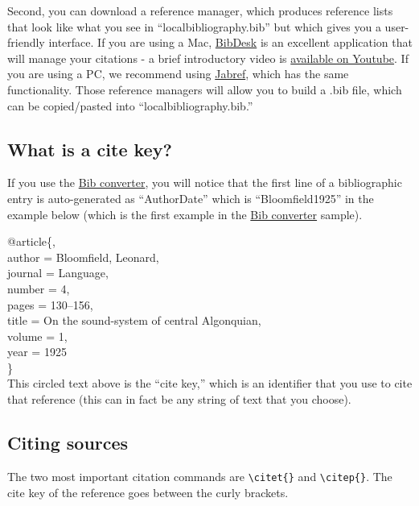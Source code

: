 \documentclass[output=paper,colorlinks,citecolor=brown,
]{langscibook}
\begin{document}
Second, you can download a reference manager, which produces reference lists that look like what you see in ``localbibliography.bib'' but which gives you a user-friendly interface. If you are using a Mac, \href{https://bibdesk.sourceforge.io}{BibDesk} is an excellent application that will manage your citations - a brief introductory video is \href{https://www.youtube.com/watch?v=sOxf1bKAxqQ}{available on Youtube}. If you are using a PC, we recommend using \href{http://www.jabref.org}{Jabref}, which has the same functionality. Those reference managers will allow you to build a .bib file, which can be copied/pasted into ``localbibliography.bib.'' 

\subsection{What is a cite key?}

If you use the \href{http://glottotopia.org/doc2tex/doc2bib}{Bib converter}, you will notice that the first line of a bibliographic entry is auto-generated as ``AuthorDate'' which is ``Bloomfield1925'' in the example below (which is the first example in the \href{http://glottotopia.org/doc2tex/doc2bib}{Bib converter} sample). 

\indent @article\{, \\
\indent \indent author = {Bloomfield, Leonard}, \\
\indent\indent journal = {Language}, \\
\indent\indent number = {4},\\
\indent\indent pages = {130--156},\\
\indent\indent title = {On the sound-system of central {Algonquian}},\\
\indent\indent volume = {1},\\
\indent\indent year = {1925}\\
\indent\indent\} \\

\noindent This circled text above is the ``cite key,'' which is an identifier that you use to cite that reference (this can in fact be any string of text that you choose).

\subsection{Citing sources}


The two most important citation commands are \verb|\citet{}| and \verb|\citep{}|. The cite key of the reference goes between the curly brackets.
 
\end{document}
